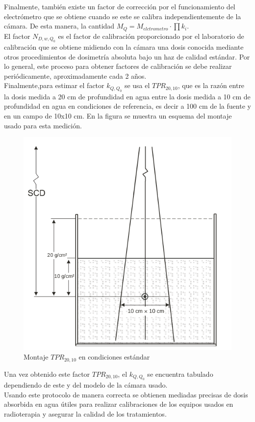 Finalmente, también existe un factor de corrección por el funcionamiento del electrómetro que se obtiene cuando se este se calibra independientemente de la cámara. De esta manera, la cantidad $M_Q=M_{elctrometro}\cdot \prod k_i$.\\

El factor $N_{D,w,Q_{0}}$ es el factor de calibración proporcionado por el laboratorio de calibración que se obtiene midiendo con la cámara una dosis conocida mediante otros procedimientos de dosimetría absoluta bajo un haz de calidad estándar. Por lo general, este proceso para obtener factores de calibración se debe realizar periódicamente, aproximadamente cada 2 años.\\

Finalmente,para estimar el factor $k_{Q,Q_{0}}$ se usa el $TPR_{20,10}$, que es la razón entre la dosis medida a 20 cm de profundidad en agua entre la dosis medida a 10 cm de profundidad en agua en condiciones de referencia, es decir a 100 cm de la fuente y en un campo de 10x10 cm. En la figura se muestra un esquema del montaje usado para esta medición.\\
 \begin{figure}[H]
 	\centering
 	\includegraphics[width=0.7\linewidth]{images/TPR2010.png}
 	\caption{Montaje $TPR_{20,10} $ en condiciones estándar\cite{TPR398}}
 	\label{fig:TPR2010}
 \end{figure}
Una vez obtenido este factor $TPR_{20,10}$, el $k_{Q,Q_{0}}$ se encuentra tabulado dependiendo de este y del modelo de la cámara usado\cite{TPR398}.\\

Usando este protocolo de manera correcta se obtienen mediadas precisas de dosis absorbida en agua útiles para realizar calibraciones de los equipos usados en radioterapia y asegurar la calidad de los tratamientos.\\


